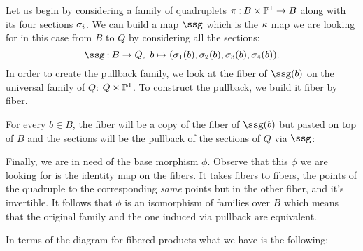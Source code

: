 \documentclass[12pt]{memoir}
\begin{document}
\begin{ptcb}
    Let us begin by considering a family of quadruplets $\pi\mathbin{:} B\times\mathbb{P}^1\to B$ along with its four sections $\sigma_i$. We can build a map $\ssg$ which is the $\kappa$ map we are looking for in this case from $B$ to $Q$ by considering all the sections:
    $$\ssg\:B\to Q,\ b\mapsto(\sg_1(b),\sg_2(b),\sg_3(b),\sg_4(b)).$$
    In order to create the pullback family, we look at the fiber of $\ssg(b)$ on the universal family of $Q$: $Q\times\mathbb{P}^1$. To construct the pullback, we build it fiber by fiber.\par 
    For every $b\in B$, the fiber will be a copy of the fiber of $\ssg(b)$ but pasted on top of $B$ and the sections will be the pullback of the sections of $Q$ via $\ssg$:
    \begin{center}
    \end{center}
Finally, we are in need of the base morphism $\phi$. Observe that this $\phi$ we are looking for is the identity map on the fibers. It takes fibers to fibers, the points of the quadruple to the corresponding \emph{same} points but in the other fiber, and it's invertible. It follows that $\phi$ is an isomorphism of families over $B$ which means that the original family and the one induced via pullback are equivalent.\par
In terms of the diagram for fibered products what we have is the following:
\begin{center}

\end{center}
\end{ptcb}
\end{document}
